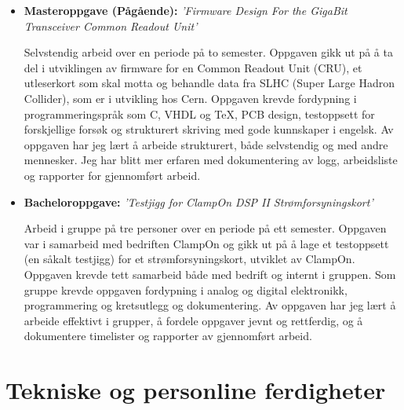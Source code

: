 \documentclass[11pt,a4paper,sans, norsk]{moderncv}        %
\begin{document}
\begin{itemize}

\item{\textbf{Masteroppgave (Pågående):} \textit{'Firmware Design For the GigaBit Transceiver Common Readout Unit'}

\vspace{3pt}

\small{Selvstendig arbeid over en periode på to semester. Oppgaven gikk ut på å ta del i utviklingen av firmware for en Common Readout Unit (CRU), et utleserkort som skal motta og behandle data fra SLHC (Super Large Hadron Collider), som er i utvikling hos Cern. Oppgaven krevde fordypning i programmeringspråk som C, VHDL og TeX, PCB design, testoppsett for forskjellige forsøk og strukturert skriving med gode kunnskaper i engelsk. Av oppgaven har jeg lært å arbeide strukturert, både selvstendig og med andre mennesker. Jeg har blitt mer erfaren med dokumentering av logg, arbeidsliste og rapporter for gjennomført arbeid.}}

\vspace{6pt}

\item{\textbf{Bacheloroppgave:} \textit{'Testjigg for ClampOn DSP II Strømforsyningskort'}

\vspace{3pt}

\small{Arbeid i gruppe på tre personer over en periode på ett semester. Oppgaven var i samarbeid med bedriften ClampOn og gikk ut på å lage et testoppsett (en såkalt testjigg) for et strømforsyningskort, utviklet av ClampOn. Oppgaven krevde tett samarbeid både med bedrift og internt i gruppen. Som gruppe krevde oppgaven fordypning i analog og digital elektronikk, programmering og kretsutlegg og dokumentering. Av oppgaven har jeg lært å arbeide effektivt i grupper, å fordele oppgaver jevnt og rettferdig, og å dokumentere timelister og rapporter av gjennomført arbeid.}}

\end{itemize}

\section{Tekniske og personline ferdigheter}

\vspace{6pt}
\end{document}
